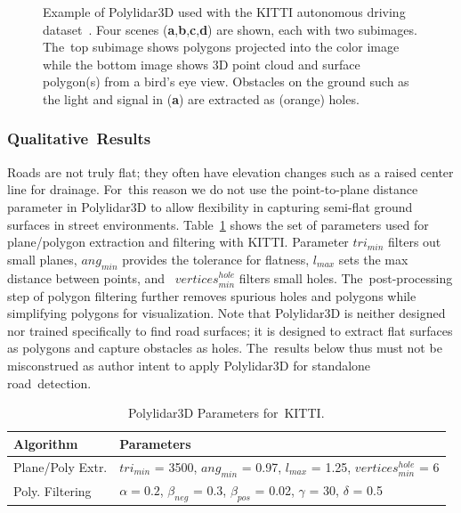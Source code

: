 \begin{figure}[ht]
  \caption[Example of Polylidar3D used with the KITTI autonomous driving dataset]{Example of Polylidar3D used with the KITTI autonomous driving dataset~\cite{geiger_vision_2013}. Four scenes (\textbf{a},\textbf{b},\textbf{c},\textbf{d}) are shown, each with two subimages. The~top subimage shows polygons projected into the color image while the bottom image shows 3D point cloud and surface polygon(s) from a bird's eye view. Obstacles on the ground such as the light and signal in (\textbf{a}) are extracted as (orange) holes. }\label{fig:ch3_kitti}
\end{figure}


\subsubsection{Qualitative~Results}\label{sec:ch3_results_kitti_qual}

Roads are not truly flat; they often have elevation changes such as a raised center line for drainage. For~this reason we do not use the point-to-plane distance parameter in Polylidar3D to allow flexibility in capturing semi-flat ground surfaces in street environments. Table~\ref{table:ch3_kitti_parameters} shows the set of parameters used for plane/polygon extraction and filtering with KITTI. Parameter $tri_{min}$ filters out small planes, $ang_{min}$ provides the tolerance for flatness, $l_{max}$ sets the max distance between points, and~ $vertices^{hole}_{min}$ filters small holes. The~post-processing step of polygon filtering further removes spurious holes and polygons while simplifying polygons for visualization. Note that Polylidar3D is neither designed nor trained specifically to find road surfaces; it is designed to extract flat surfaces as polygons and capture obstacles as holes. The~results below thus must not be misconstrued as author intent to apply Polylidar3D for standalone road~detection. 

\begin{table}[H]
\centering
\caption{Polylidar3D Parameters for~KITTI.}\label{table:ch3_kitti_parameters}
\begin{tabular}{@{}ll@{}}
\toprule
\textbf{Algorithm}        & \textbf{Parameters}                                                          \\ \midrule
Plane/Poly Extr.      & $tri_{min}$ = 3500, $ang_{min}$ = 0.97, $l_{max}$ = 1.25, $vertices^{hole}_{min}$ = 6      \\
Poly. Filtering      & $\alpha = 0.2$, $\beta_{neg}$ = 0.3, $\beta_{pos}$ = 0.02, $\gamma$ = 30, $\delta$ = 0.5      \\ \bottomrule
\end{tabular}
\end{table}


